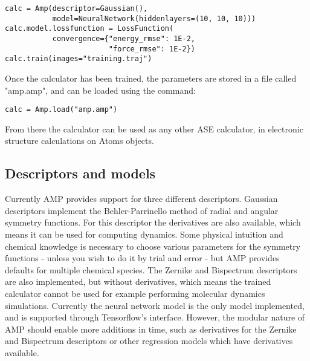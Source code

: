 \begin{verbatim}
calc = Amp(descriptor=Gaussian(),
           model=NeuralNetwork(hiddenlayers=(10, 10, 10)))
calc.model.lossfunction = LossFunction(
           convergence={"energy_rmse": 1E-2,
                        "force_rmse": 1E-2})
calc.train(images="training.traj")
\end{verbatim}

Once the calculator has been trained, the parameters
are stored in a file called "amp.amp",
and can be loaded using the command:

\begin{verbatim}
calc = Amp.load("amp.amp")
\end{verbatim}

From there the calculator can be used as any other ASE calculator,
in electronic structure calculations on Atoms objects.

\subsection{Descriptors and models}
Currently AMP provides support for three different descriptors.
Gaussian descriptors implement the Behler-Parrinello method
of radial and angular symmetry functions. For this descriptor
the derivatives are also available, which means it can be used
for computing dynamics. Some physical intuition and chemical knowledge
is necessary to choose various parameters for the symmetry functions -
unless you wish to do it by trial and error - but AMP provides
defaults for multiple chemical species.
The Zernike and Bispectrum descriptors are also implemented,
but without derivatives, which means the trained calculator
cannot be used for example performing molecular dynamics simulations.
Currently the neural network model is the only model implemented,
and is supported through Tensorflow's interface.
However, the modular nature of AMP should enable more additions
in time, such as derivatives for the Zernike and Bispectrum descriptors
or other regression models which have derivatives available.
